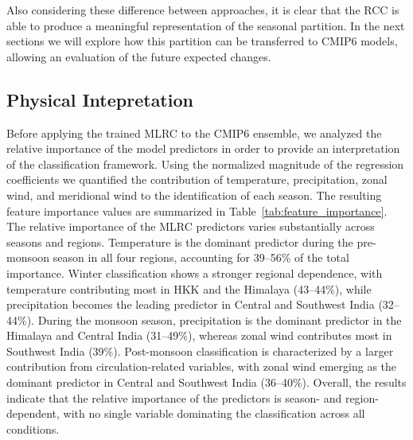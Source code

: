 Also considering these difference between approaches, it is clear that the RCC is able to produce a meaningful representation of the seasonal partition. In the next sections we will explore how this partition can be transferred to CMIP6 models, allowing an evaluation of the future expected changes.  

\subsection{Physical Intepretation}
Before applying the trained MLRC to the CMIP6 ensemble, we analyzed the relative importance of the model predictors in order to provide an interpretation of the classification framework. Using the normalized magnitude of the regression coefficients we quantified the contribution of temperature, precipitation, zonal wind, and meridional wind to the identification of each season. The resulting feature importance values are summarized in Table~\ref{tab:feature_importance}. The relative importance of the MLRC predictors varies substantially across seasons and regions.  Temperature is the dominant predictor during the pre-monsoon season in all four regions, accounting for 39--56\% of the total importance. Winter classification shows a stronger regional dependence, with temperature contributing most in HKK and the Himalaya (43--44\%), while precipitation becomes the leading predictor in Central and Southwest India (32--44\%). During the monsoon season, precipitation is the dominant predictor in the Himalaya and Central India (31--49\%), whereas zonal wind contributes most in Southwest India (39\%). Post-monsoon classification is characterized by a larger contribution from circulation-related variables, with zonal wind emerging as the dominant predictor in Central and Southwest India (36--40\%). Overall, the results indicate that the relative importance of the predictors is season- and region-dependent, with no single variable dominating the classification across all conditions.

